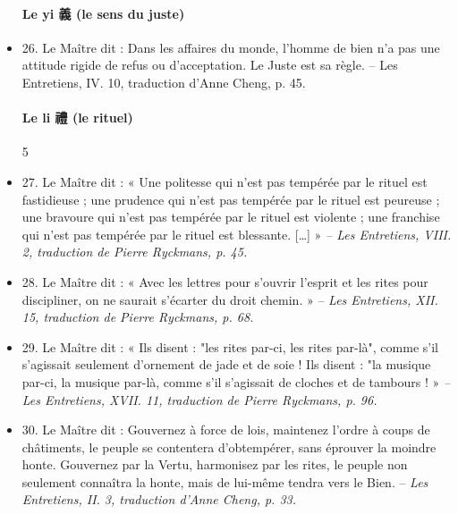 \begin{itemize}
\paragraph{Le yi 義 (le sens du juste)}  
\item 26. \newline Le Maître dit : Dans les affaires du monde, l’homme de bien n’a pas une attitude rigide de refus ou d’acceptation. Le Juste est sa règle.  -- Les Entretiens, IV. 10, traduction d’Anne Cheng, p. 45.  

\paragraph{Le li 禮 (le rituel)}   
5 
\item 27. \newline Le Maître dit : « Une politesse qui n’est pas tempérée par le rituel est fastidieuse ; une prudence qui n’est pas tempérée par le rituel est peureuse ; une bravoure qui n’est pas tempérée par le rituel est violente ; une franchise qui n’est pas tempérée par le rituel est blessante. […] » \textit{\small -- Les Entretiens, VIII. 2, traduction de Pierre Ryckmans, p. 45.  }
\item 28. \newline Le Maître dit : « Avec les lettres pour s’ouvrir l’esprit et les rites pour discipliner, on ne saurait s’écarter du droit chemin. » -- \textit{\small  Les Entretiens, XII. 15, traduction de Pierre Ryckmans, p. 68.  }
\item 29. \newline Le Maître dit : « Ils disent : "les rites par-ci, les rites par-là", comme s’il s’agissait seulement d’ornement de jade et de soie ! Ils disent : "la musique par-ci, la musique par-là, comme s’il s’agissait de cloches et de tambours ! » \textit{\small -- Les Entretiens, XVII. 11, traduction de Pierre Ryckmans, p. 96.  }
\item 30. \newline Le Maître dit : Gouvernez à force de lois, maintenez l’ordre à coups de châtiments, le peuple se contentera d’obtempérer, sans éprouver la moindre honte. Gouvernez par la Vertu, harmonisez par les rites, le peuple non seulement connaîtra la honte, mais de lui-même tendra vers le Bien.  -- \textit{\small  Les Entretiens, II. 3, traduction d’Anne Cheng, p. 33.  }

\end{itemize}
